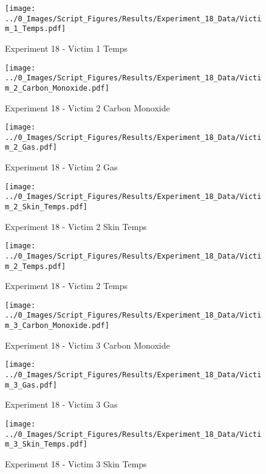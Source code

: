 	\begin{figure}[H]
		\centering
		\texttt{[image: ../0\_Images/Script\_Figures/Results/Experiment\_18\_Data/Victim\_1\_Temps.pdf]}
		\caption[]{Experiment 18 - Victim 1 Temps}
	\end{figure}
 
	\clearpage

	\begin{figure}[H]
		\centering
		\texttt{[image: ../0\_Images/Script\_Figures/Results/Experiment\_18\_Data/Victim\_2\_Carbon\_Monoxide.pdf]}
		\caption[]{Experiment 18 - Victim 2 Carbon Monoxide}
	\end{figure}
 

	\begin{figure}[H]
		\centering
		\texttt{[image: ../0\_Images/Script\_Figures/Results/Experiment\_18\_Data/Victim\_2\_Gas.pdf]}
		\caption[]{Experiment 18 - Victim 2 Gas}
	\end{figure}
 
	\clearpage

	\begin{figure}[H]
		\centering
		\texttt{[image: ../0\_Images/Script\_Figures/Results/Experiment\_18\_Data/Victim\_2\_Skin\_Temps.pdf]}
		\caption[]{Experiment 18 - Victim 2 Skin Temps}
	\end{figure}
 

	\begin{figure}[H]
		\centering
		\texttt{[image: ../0\_Images/Script\_Figures/Results/Experiment\_18\_Data/Victim\_2\_Temps.pdf]}
		\caption[]{Experiment 18 - Victim 2 Temps}
	\end{figure}
 
	\clearpage

	\begin{figure}[H]
		\centering
		\texttt{[image: ../0\_Images/Script\_Figures/Results/Experiment\_18\_Data/Victim\_3\_Carbon\_Monoxide.pdf]}
		\caption[]{Experiment 18 - Victim 3 Carbon Monoxide}
	\end{figure}
 

	\begin{figure}[H]
		\centering
		\texttt{[image: ../0\_Images/Script\_Figures/Results/Experiment\_18\_Data/Victim\_3\_Gas.pdf]}
		\caption[]{Experiment 18 - Victim 3 Gas}
	\end{figure}
 
	\clearpage

	\begin{figure}[H]
		\centering
		\texttt{[image: ../0\_Images/Script\_Figures/Results/Experiment\_18\_Data/Victim\_3\_Skin\_Temps.pdf]}
		\caption[]{Experiment 18 - Victim 3 Skin Temps}
	\end{figure}
 


